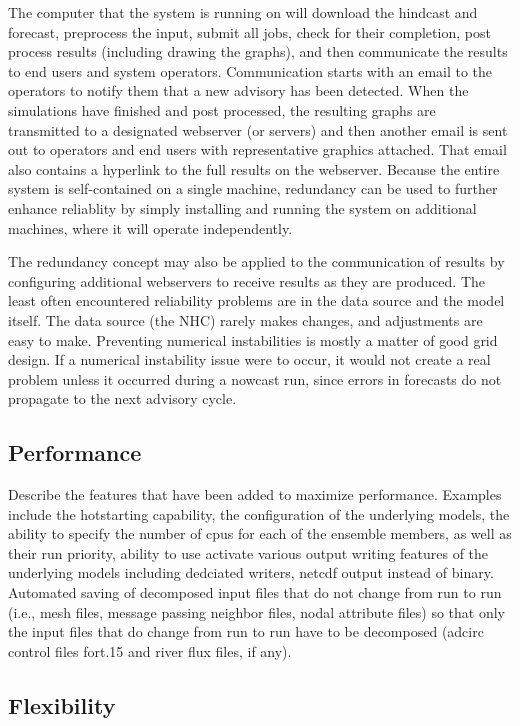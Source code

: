 \documentclass[12pt]{article}
\begin{document}
The computer that the system is running on will download the 
hindcast and forecast, preprocess the input, submit all jobs, check 
for their completion, post process results (including drawing the 
graphs), and then communicate the results to end users and system 
operators. Communication starts with an email to the operators to 
notify them that a new advisory has been detected. When the 
simulations have finished and post processed, the resulting graphs 
are transmitted to a designated webserver (or servers) and then 
another email is sent out to operators and end users with 
representative graphics attached. That email also contains a 
hyperlink to the full results on the webserver. Because the entire 
system is self-contained on a single machine, redundancy can be used 
to further enhance reliablity by simply installing and running the 
system on additional machines, where it will operate independently. 

The redundancy concept may also be applied to the communication of 
results by configuring additional webservers to receive results as 
they are produced. The least often encountered reliability problems 
are in the data source and the model itself. The data source (the 
NHC) rarely makes changes, and adjustments are easy to make. 
Preventing numerical instabilities is mostly a matter of good grid 
design. If a numerical instability issue were to occur, it would not 
create a real problem unless it occurred during a nowcast run, since 
errors in forecasts do not propagate to the next advisory cycle.

\subsection{Performance}

Describe the features that have been added to maximize performance. 
Examples include the hotstarting capability, the configuration of 
the underlying models, the ability to specify the number of cpus for 
each of the ensemble members, as well as their run priority, ability 
to use activate various output writing features of the underlying 
models including dedciated writers, netcdf output instead of binary. 
Automated saving of decomposed input files that do not change from 
run to run (i.e., mesh files, message passing neighbor files, nodal 
attribute files) so that only the input files that do change from 
run to run have to be decomposed (adcirc control files fort.15 and 
river flux files, if any). 

\subsection{Flexibility}
\end{document}
